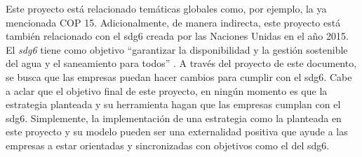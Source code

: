 \hfill

Este proyecto está relacionado temáticas globales como, por ejemplo, la ya mencionada COP 15. Adicionalmente, de manera indirecta, este proyecto está también relacionado con el \acrshort{sdg6} creada por las Naciones Unidas en el año 2015.  El \textit{\acrfull{sdg6}} tiene como objetivo “garantizar la disponibilidad y la gestión sostenible del agua y el saneamiento para todos” \parencite{world-health-organization-2017}. A través del proyecto de este documento, se busca que las empresas puedan hacer cambios para cumplir con el \acrshort{sdg6}. Cabe a aclar que el objetivo final de este proyecto, en ningún momento es que la estrategia planteada y su herramienta hagan que las empresas cumplan con el \acrshort{sdg6}. Simplemente, la implementación de una estrategia como la planteada en este proyecto y su modelo pueden ser una externalidad positiva que ayude a las empresas a estar orientadas y sincronizadas con objetivos como el del \acrshort{sdg6}. 